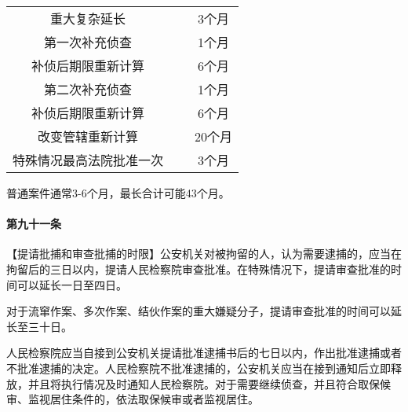 \documentclass[
    a4paper
    ]{ctexart}
\begin{document}
\begin{sloppy}
{\begin{center}
\begin{tabular}{|c|c|c|}
                
                \cline{1-1}
                \cline{3-3}
                重大复杂延长 & ~ & 3个月 \\
                \cline{1-1}
                \cline{3-3}
                第一次补充侦查 & ~ & 1个月 \\
                \cline{1-1}
                \cline{3-3}
                补侦后期限重新计算 & ~  & 6个月\\
                \cline{1-1}
                \cline{3-3}
                第二次补充侦查 & ~ & 1个月 \\
                \cline{1-1}
                \cline{3-3}
                补侦后期限重新计算 & ~ & 6个月 \\
                \cline{1-1}
                \cline{3-3}
                改变管辖重新计算 & ~ & 20个月\\
                \cline{1-1}
                \cline{3-3}
                特殊情况最高法院批准一次 & ~ & 3个月\\
                \hline
            \end{tabular}
        \end{center}

        \vspace{1em}
        普通案件通常3-6个月，最长合计可能43个月。

        \paragraph{
            第九十一条
        }
        【提请批捕和审查批捕的时限】公安机关对被拘留的人，认为需要逮捕的，应当在拘留后的三日以内，提请人民检察院审查批准。在特殊情况下，提请审查批准的时间可以延长一日至四日。

        对于流窜作案、多次作案、结伙作案的重大嫌疑分子，提请审查批准的时间可以延长至三十日。

        人民检察院应当自接到公安机关提请批准逮捕书后的七日以内，作出批准逮捕或者不批准逮捕的决定。人民检察院不批准逮捕的，公安机关应当在接到通知后立即释放，并且将执行情况及时通知人民检察院。对于需要继续侦查，并且符合取保候审、监视居住条件的，依法取保候审或者监视居住。


    }

\end{sloppy}
\end{document}
